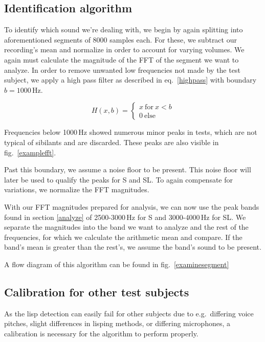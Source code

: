 \documentclass{IEEEtran}
\begin{document}
\subsection{Identification algorithm}\label{identify}

To identify which sound we're dealing with,
we begin by again splitting into aforementioned segments of 8000 samples each.
For these, we subtract our recording's mean and normalize in order to account for varying volumes.
We again must calculate the magnitude of the FFT of the segment we want to analyze.
In order to remove unwanted low frequencies not made by the test subject,
we apply a high pass filter as described in eq.\ \ref{highpass} with boundary \(b = 1000\)\,Hz.

\begin{equation}
H(x, b) = \begin{cases} x\ \mathrm{for}\ x < b \\ 0\ \mathrm{else} \end{cases}\label{highpass}
\end{equation}

Frequencies below 1000\,Hz showed numerous minor peaks in tests,
which are not typical of sibilants and are discarded.
These peaks are also visible in fig.\ \ref{examplefft}.

Past this boundary, we assume a noise floor to be present.
This noise floor will later be used to qualify the peaks for S and SL.
To again compensate for variations, we normalize the FFT magnitudes.

With our FFT magnitudes prepared for analysis,
we can now use the peak bands found in section \ref{analyze} of 2500-3000\,Hz for S and 3000-4000\,Hz for SL.
We separate the magnitudes into the band we want to analyze and the rest of the frequencies,
for which we calculate the arithmetic mean and compare.
If the band's mean is greater than the rest's,
we assume the band's sound to be present.

A flow diagram of this algorithm can be found in fig.\ \ref{examinesegment}

\subsection{Calibration for other test subjects}\label{calibration}

As the lisp detection can easily fail for other subjects due to e.g.\ differing voice pitches,
slight differences in lisping methods, or differing microphones,
a calibration is necessary for the algorithm to perform properly.
\end{document}
